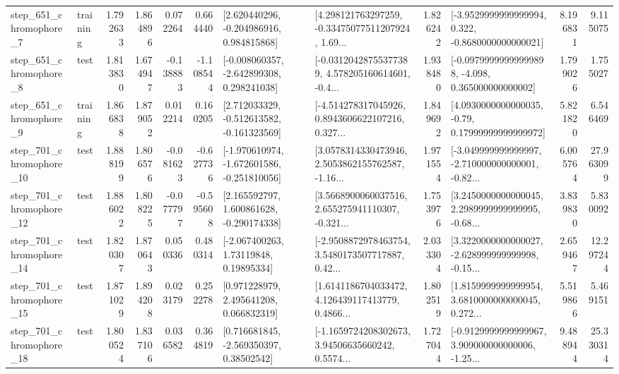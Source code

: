 \begin{tabular}{llrrrrllrlrr}
   step\_651\_chromophore\_7 &  training &      1.792633 &    1.864896 &      0.072264 &  0.664440 &    [2.620440296, -0.204986916, 0.984815868] &  [4.298121763297259, -0.33475077511207924, 1.69... &       1.826242 &  [-3.9529999999999994, 0.322, -0.8680000000000021] &            8.196831 &          9.115075 \\
   step\_651\_chromophore\_8 &      test &      1.813830 &    1.674947 &     -0.138883 & -1.108544 &   [-0.008060357, -2.642899308, 0.298241038] &  [-0.03120428755377389, 4.578205160614601, -0.4... &       1.938480 &  [-0.09799999999999898, -4.098, 0.365000000000002] &            1.799026 &          1.755027 \\
   step\_651\_chromophore\_9 &  training &      1.866838 &    1.879052 &      0.012214 &  0.160205 &   [2.712033329, -0.512613582, -0.161323569] &  [-4.514278317045926, 0.8943606622107216, 0.327... &       1.849692 &   [4.0930000000000035, -0.79, 0.17999999999999972] &            5.821820 &          6.546469 \\
  step\_701\_chromophore\_10 &      test &      1.888199 &    1.806576 &     -0.081623 & -0.627736 &  [-1.970610974, -1.672601586, -0.251810056] &  [3.0578314330473946, 2.5053862155762587, -1.16... &       1.971554 &  [-3.049999999999997, -2.710000000000001, -0.82... &            6.005764 &         27.963099 \\
  step\_701\_chromophore\_12 &      test &      1.886022 &    1.808225 &     -0.077797 & -0.595608 &    [2.165592797, 1.600861628, -0.290174338] &  [3.5668900060037516, 2.655275941110307, -0.321... &       1.753976 &  [3.2450000000000045, 2.2989999999999995, -0.68... &            3.839830 &          5.830092 \\
  step\_701\_chromophore\_14 &      test &      1.820307 &    1.870643 &      0.050336 &  0.480314 &      [-2.067400263, 1.73119848, 0.19895334] &  [-2.9508872978463754, 3.5480173507717887, 0.42... &       2.033304 &  [3.3220000000000027, -2.628999999999998, -0.15... &            2.659467 &         12.297244 \\
  step\_701\_chromophore\_15 &      test &      1.871029 &    1.894208 &      0.023179 &  0.252278 &     [0.971228979, 2.495641208, 0.066832319] &  [1.6141186704033472, 4.126439117413779, 0.4866... &       1.802519 &  [1.8159999999999954, 3.6810000000000045, 0.272... &            5.519866 &          5.469151 \\
  step\_701\_chromophore\_18 &      test &      1.800524 &    1.837106 &      0.036582 &  0.364819 &     [0.716681845, -2.569350397, 0.38502542] &  [-1.1659724208302673, 3.94506635660242, 0.5574... &       1.727044 &  [-0.9129999999999967, 3.909000000000006, -1.25... &            9.488944 &         25.330314 \\

\end{tabular}
